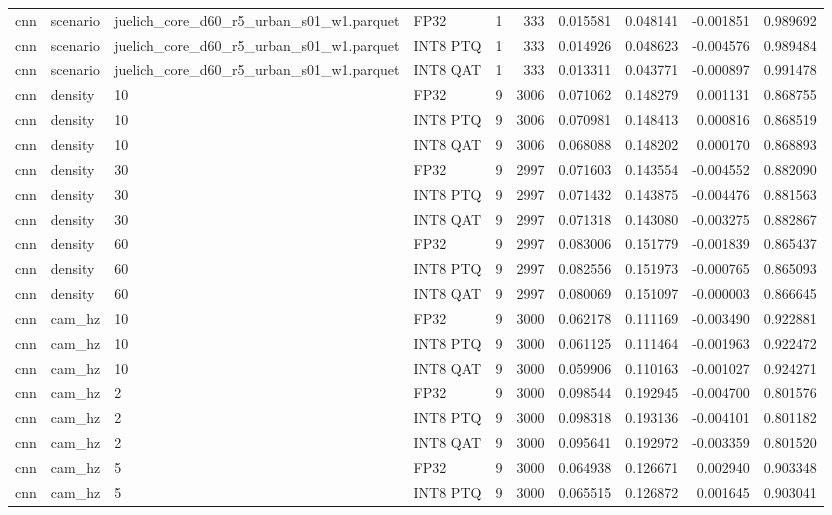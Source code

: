 \begin{tabular}{llllrrrrrr}
cnn & scenario & juelich\_core\_d60\_r5\_urban\_s01\_w1.parquet & FP32 & 1 & 333 & 0.015581 & 0.048141 & -0.001851 & 0.989692 \\
cnn & scenario & juelich\_core\_d60\_r5\_urban\_s01\_w1.parquet & INT8 PTQ & 1 & 333 & 0.014926 & 0.048623 & -0.004576 & 0.989484 \\
cnn & scenario & juelich\_core\_d60\_r5\_urban\_s01\_w1.parquet & INT8 QAT & 1 & 333 & 0.013311 & 0.043771 & -0.000897 & 0.991478 \\
cnn & density & 10 & FP32 & 9 & 3006 & 0.071062 & 0.148279 & 0.001131 & 0.868755 \\
cnn & density & 10 & INT8 PTQ & 9 & 3006 & 0.070981 & 0.148413 & 0.000816 & 0.868519 \\
cnn & density & 10 & INT8 QAT & 9 & 3006 & 0.068088 & 0.148202 & 0.000170 & 0.868893 \\
cnn & density & 30 & FP32 & 9 & 2997 & 0.071603 & 0.143554 & -0.004552 & 0.882090 \\
cnn & density & 30 & INT8 PTQ & 9 & 2997 & 0.071432 & 0.143875 & -0.004476 & 0.881563 \\
cnn & density & 30 & INT8 QAT & 9 & 2997 & 0.071318 & 0.143080 & -0.003275 & 0.882867 \\
cnn & density & 60 & FP32 & 9 & 2997 & 0.083006 & 0.151779 & -0.001839 & 0.865437 \\
cnn & density & 60 & INT8 PTQ & 9 & 2997 & 0.082556 & 0.151973 & -0.000765 & 0.865093 \\
cnn & density & 60 & INT8 QAT & 9 & 2997 & 0.080069 & 0.151097 & -0.000003 & 0.866645 \\
cnn & cam\_hz & 10 & FP32 & 9 & 3000 & 0.062178 & 0.111169 & -0.003490 & 0.922881 \\
cnn & cam\_hz & 10 & INT8 PTQ & 9 & 3000 & 0.061125 & 0.111464 & -0.001963 & 0.922472 \\
cnn & cam\_hz & 10 & INT8 QAT & 9 & 3000 & 0.059906 & 0.110163 & -0.001027 & 0.924271 \\
cnn & cam\_hz & 2 & FP32 & 9 & 3000 & 0.098544 & 0.192945 & -0.004700 & 0.801576 \\
cnn & cam\_hz & 2 & INT8 PTQ & 9 & 3000 & 0.098318 & 0.193136 & -0.004101 & 0.801182 \\
cnn & cam\_hz & 2 & INT8 QAT & 9 & 3000 & 0.095641 & 0.192972 & -0.003359 & 0.801520 \\
cnn & cam\_hz & 5 & FP32 & 9 & 3000 & 0.064938 & 0.126671 & 0.002940 & 0.903348 \\
cnn & cam\_hz & 5 & INT8 PTQ & 9 & 3000 & 0.065515 & 0.126872 & 0.001645 & 0.903041 \\

\end{tabular}
